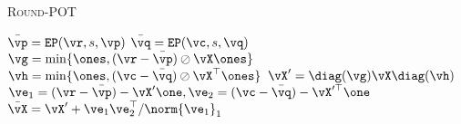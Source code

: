 \begin{algorithm}[H]
    \caption{\textsc{Round-POT}}
    \label{alg:rounding}
    \begin{algorithmic} [1]
        \STATE \( \bar{\vp} = \mathtt{EP}(\vr, s, \vp) \) 
        \STATE \( \bar{\vq} = \mathtt{EP}(\vc, s, \vq) \)
        \STATE \(\vg = \min\{\ones, (\vr-\bar{\vp}) \oslash \vX \ones \}\)
        \STATE\(\vh = \min\{\ones, (\vc-\bar{\vq}) \oslash \vX^\top \ones \} \)
        \STATE \( \vX' = \diag(\vg) \vX \diag(\vh)\)
        \STATE \( \ve_1 = (\vr - \bar{\vp}) - \vX' \one, \ve_2 = (\vc - \bar{\vq}) - \vX'^\top \one\)
        \STATE \( \bar{\vX} = \vX' + \ve_1 \ve_2^\top / \norm{\ve_1}_1 \)
        \ENSURE{$ \Bar{\vx} = (\Bar{\vX}$, $\Bar{\vp}$,  $\Bar{\vq})$}
    \end{algorithmic}
\end{algorithm}
